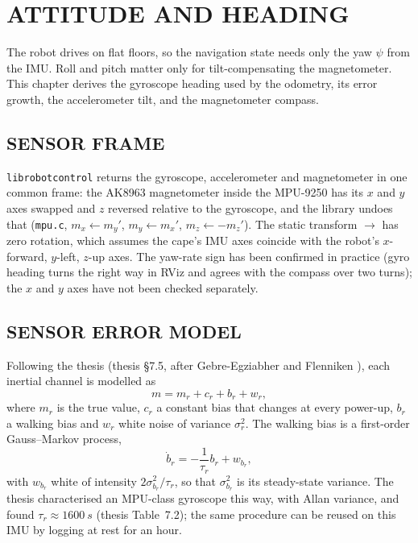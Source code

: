 \chapter{ATTITUDE AND HEADING}
\label{ch:attitude}

The robot drives on flat floors, so the navigation state needs only the yaw
$\psi$ from the IMU. Roll and pitch matter only for tilt-compensating the
magnetometer. This chapter derives the gyroscope heading used by the odometry,
its error growth, the accelerometer tilt, and the magnetometer compass.

\section{SENSOR FRAME}

\texttt{librobotcontrol} returns the gyroscope, accelerometer and
magnetometer in one common frame: the AK8963 magnetometer inside the MPU-9250
has its $x$ and $y$ axes swapped and $z$ reversed relative to the gyroscope,
and the library undoes that (\texttt{mpu.c}, $m_x\leftarrow m_y'$,
$m_y\leftarrow m_x'$, $m_z\leftarrow -m_z'$). The static transform
$\to$ has zero rotation, which assumes the
cape's IMU axes coincide with the robot's $x$-forward, $y$-left, $z$-up axes.
The yaw-rate sign has been confirmed in practice (gyro heading turns the right
way in RViz and agrees with the compass over two turns); the $x$ and $y$ axes
have not been checked separately.

\section{SENSOR ERROR MODEL}

Following the thesis (thesis \S7.5, after Gebre-Egziabher
\cite{gebreegziabher2004design} and Flenniken \cite{flenniken2005modeling}),
each inertial channel is modelled as
\begin{equation}\label{eq:sensormodel}
m = m_r + c_r + b_r + w_r,
\end{equation}
where $m_r$ is the true value, $c_r$ a constant bias that changes at every
power-up, $b_r$ a walking bias and $w_r$ white noise of variance $\sigma_r^2$.
The walking bias is a first-order Gauss--Markov process,
\begin{equation}\label{eq:walkingbias}
\dot b_r = -\frac{1}{\tau_r}b_r + w_{b_r},
\end{equation}
with $w_{b_r}$ white of intensity $2\sigma_{b_r}^2/\tau_r$, so that
$\sigma_{b_r}^2$ is its steady-state variance. The thesis characterised an
MPU-class gyroscope this way, with Allan variance, and found
$\tau_r\approx\SI{1600}{s}$ (thesis Table~7.2); the same procedure can be
reused on this IMU by logging  at rest for an hour.

